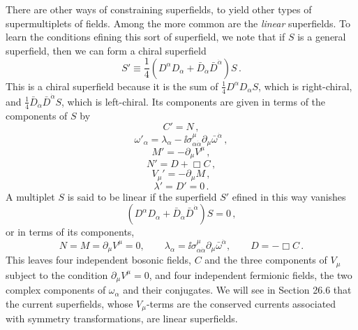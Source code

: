 There are other ways of constraining superfields, to yield other types of
supermultiplets of fields. Among the more common are the \emph{linear}
superfields. To learn the conditions \dd efining this sort of superfield, we note
that if $S$ is a general superfield, then we can form a chiral superfield
\begin{equation}
  S'\equiv\frac14
  \left(D^\alpha D_\alpha
    +\bar D_{\dot\alpha}\bar D^{\dot\alpha}\right)S\,.
  \tag{26.3.37}\label{eq:26.3.37}
\end{equation}
This is a chiral superfield because it is the sum of
\(\frac14D^\alpha D_\alpha S\), which is right-chiral, and
\(\frac14\bar D_{\dot\alpha}\bar D^{\dot\alpha}S\), which is left-chiral.
Its components are
given in terms of the components of $S$ by
\begin{equation}
  C'=N\,,
  \tag{26.3.38}\label{eq:26.3.38}
\end{equation}
\begin{equation}
  \omega'_\alpha
  =\lambda_\alpha-\ii\sigma^\mu_{\alpha\dot\alpha}
    \partial_\mu\bar\omega^{\dot\alpha}\,,
  \tag{26.3.39}\label{eq:26.3.39}
\end{equation}
\begin{equation}
  M'=-\partial_\mu V^\mu\,,
  \tag{26.3.40}\label{eq:26.3.40}
\end{equation}
\begin{equation}
  N'=D+\Box C\,,
  \tag{26.3.41}\label{eq:26.3.41}
\end{equation}
\begin{equation}
  V_\mu'=-\partial_\mu M\,,
  \tag{26.3.42}\label{eq:26.3.42}
\end{equation}
\begin{equation}
  \lambda'=D'=0\,.
  \tag{26.3.43}\label{eq:26.3.43}
\end{equation}
A multiplet $S$ is said to be linear if the superfield $S'$ \dd efined in this
way vanishes
\begin{equation}
  \left(D^\alpha D_\alpha
    +\bar D_{\dot\alpha}\bar D^{\dot\alpha}\right)S=0\,,
  \tag{26.3.44}\label{eq:26.3.44}
\end{equation}
or in terms of its components,
\begin{equation}
  N=M=\partial_\mu V^\mu=0,\qquad
  \lambda_\alpha
    =\ii\sigma^\mu_{\alpha\dot\alpha}\partial_\mu
      \bar\omega^{\dot\alpha},\qquad
  D=-\Box C\,.
  \tag{26.3.45}\label{eq:26.3.45}
\end{equation}
This leaves four independent bosonic fields, $C$ and the three components of
$V_\mu$ subject to the condition $\partial_\mu V^\mu=0$, and four independent
fermionic fields, the two complex components of \(\omega_\alpha\) and their
conjugates. We
will see in Section 26.6 that the current superfields, whose $V_\mu$-terms are
the conserved currents associated with symmetry transformations, are linear
superfields.
